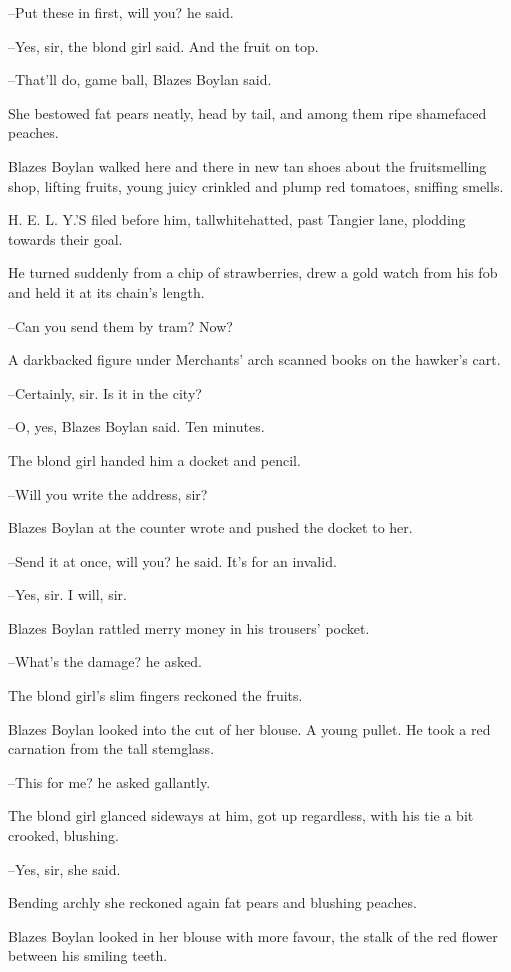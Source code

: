 --Put these in first, will you? he said.

--Yes, sir, the blond girl said. And the fruit on top.

--That'll do, game ball, Blazes Boylan said.

She bestowed fat pears neatly, head by tail, and among them ripe
shamefaced peaches.

Blazes Boylan walked here and there in new tan shoes about the
fruitsmelling shop, lifting fruits, young juicy crinkled and plump red
tomatoes, sniffing smells.

H. E. L. Y.'S filed before him, tallwhitehatted,
past Tangier lane,
plodding towards their goal.

He turned suddenly from a chip of strawberries, drew a gold watch
from his fob and held it at its chain's length.

--Can you send them by tram? Now?

A darkbacked figure under Merchants' arch scanned books on the
hawker's cart.

--Certainly, sir. Is it in the city?

--O, yes, Blazes Boylan said. Ten minutes.

The blond girl handed him a docket and pencil.

--Will you write the address,
sir?

Blazes Boylan at the counter wrote and pushed the docket to her.

--Send it at once, will you? he said. It's for an invalid.

--Yes, sir. I will, sir.

Blazes Boylan rattled merry money in his trousers' pocket.

--What's the damage? he asked.

The blond girl's slim fingers reckoned the fruits.

Blazes Boylan looked into the cut of her blouse. A young pullet. He
took a red carnation from the tall stemglass.

--This for me? he asked gallantly.

The blond girl glanced sideways at him,
got up regardless, with his tie
a bit crooked, blushing.

--Yes, sir, she said.

Bending archly she reckoned again fat pears and blushing peaches.

Blazes Boylan looked in her blouse with more favour, the stalk of the
red flower between his smiling teeth.

